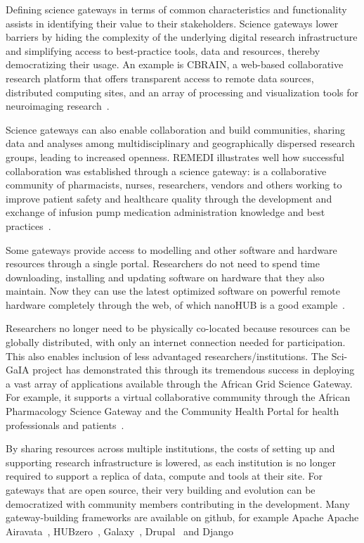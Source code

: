 \documentclass[review]{elsarticle}
\begin{document}
Defining science gateways in terms of common characteristics and functionality assists in identifying their value to their stakeholders. Science gateways lower barriers by hiding the complexity of the underlying digital research infrastructure and simplifying access to best-practice tools, data and resources, thereby democratizing their usage. An example is CBRAIN, a web-based collaborative research platform that offers transparent access to remote data sources, distributed computing sites, and an array of processing and visualization tools for neuroimaging research~\cite{cbrain-70}. 

Science gateways can also enable collaboration and build communities, sharing data and analyses among multidisciplinary and geographically dispersed research groups, leading to increased openness. REMEDI illustrates well  how successful collaboration was established through a science gateway: is a collaborative community of pharmacists, nurses, researchers, vendors and others working to improve patient safety and healthcare quality through the development and exchange of infusion pump medication administration knowledge and best practices~\cite{remedi-71}.  

Some  gateways provide access to  modelling and other software and hardware resources through a single portal. Researchers do not need to spend time downloading, installing and updating software on hardware that they also maintain. Now they can use the latest optimized software on powerful remote hardware completely through the web, of which nanoHUB is a good example~\cite{nanohub-33}. 

Researchers no longer need to be physically co-located because resources can be globally distributed, with only an internet connection needed for participation. This also enables inclusion of less advantaged researchers/institutions. The Sci-GaIA project has demonstrated this through its tremendous success in deploying a vast array of applications available through the African Grid Science Gateway. For example, it supports a virtual collaborative community through the African Pharmacology Science Gateway and the Community Health Portal for health professionals and patients~\cite{sci-gaia-22}. 

By sharing resources across multiple institutions, the costs of setting up and supporting research infrastructure is lowered, as each institution is no longer required to support a replica of data, compute and tools at their site. For gateways that are open source, their very building and evolution can be democratized with community members contributing in the development. Many gateway-building frameworks are  available on github, for example Apache Apache Airavata~\cite{airavata}, HUBzero~\cite{hubzero-55}, Galaxy~\cite{galaxy}, Drupal~\cite{drupal} and Django~\cite{django}
\end{document}
